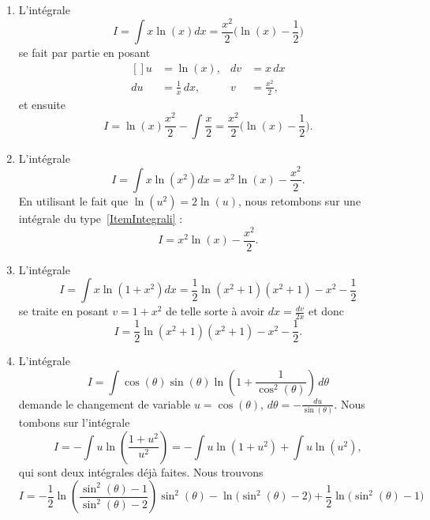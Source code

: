 \begin{enumerate}
	\item	\label{ItemIntegrali}
	      L'intégrale
	      \begin{equation}
		      \boxed{I=\int x\ln(x)dx=\frac{ x^2 }{2}\big( \ln(x)-\frac{ 1 }{2} \big)}
	      \end{equation}
	      se fait par partie en posant
	      \begin{equation}
		      \begin{aligned}[]
			      u  & =\ln(x),            & dv & =x\,dx            \\
			      du & =\frac{1}{ x }\,dx, & v  & =\frac{ x^2 }{2},
		      \end{aligned}
	      \end{equation}
	      et ensuite
	      \begin{equation}
		      I=\ln(x)\frac{ x^2 }{2}-\int\frac{ x }{2}=\frac{ x^2 }{2}\big( \ln(x)-\frac{ 1 }{2} \big).
	      \end{equation}

	\item
	      L'intégrale
	      \begin{equation}
		      \boxed{I=\int x\ln(x^2)dx=x^2\ln(x)-\frac{ x^2 }{2}.}
	      \end{equation}
	      En utilisant le fait que \( \ln(u^2)=2\ln(u)\), nous retombons sur une intégrale du type~\ref{ItemIntegrali} :
	      \begin{equation}
		      I=x^2\ln(x)-\frac{ x^2 }{2}.
	      \end{equation}
	\item
	      L'intégrale
	      \begin{equation}		\label{EqTrucIntxlnxsqpun}
		      \boxed{I=\int x\ln(1+x^2)dx=\frac{ 1 }{2}\ln(x^2+1)(x^2+1)-x^2-\frac{ 1 }{2}}
	      \end{equation}
	      se traite en posant \( v=1+x^2\) de telle sorte à avoir \( dx=\frac{ dv }{ 2x }\) et donc
	      \begin{equation}
		      I=\frac{ 1 }{2}\ln(x^2+1)(x^2+1)-x^2-\frac{ 1 }{2}.
	      \end{equation}

	\item
	      L'intégrale
	      \begin{equation}
		      I=\int \cos(\theta)\sin(\theta)\ln\left( 1+\frac{1}{ \cos^2(\theta) } \right)\,d\theta
	      \end{equation}
	      demande le changement de variable \( u=\cos(\theta)\), \( d\theta=-\frac{ du }{ \sin(\theta) }\). Nous tombons sur l'intégrale
	      \begin{equation}
		      I=-\int u\ln\left( \frac{ 1+u^2 }{ u^2 } \right)=-\int u\ln(1+u^2)+\int u\ln(u^2),
	      \end{equation}
	      qui sont deux intégrales déjà faites. Nous trouvons
	      \begin{equation}
		      I=-\frac{ 1 }{2}\ln\left( \frac{ \sin^2(\theta)-1 }{ \sin^2(\theta)-2 } \right)\sin^2(\theta)-\ln\big( \sin^2(\theta)-2 \big)+\frac{ 1 }{2}\ln\big( \sin^2(\theta)-1 \big)
	      \end{equation}


\end{enumerate}
